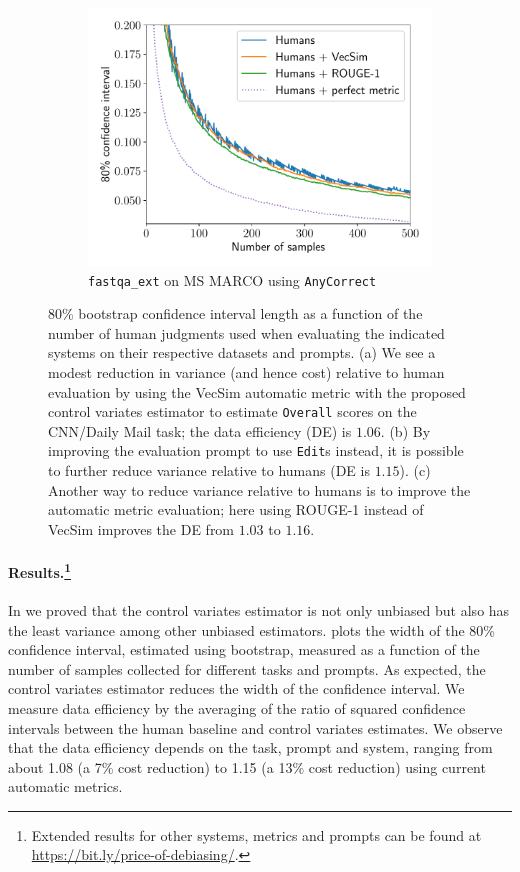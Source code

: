 \begin{figure}[th]
\begin{subfigure}[b]{0.32\textwidth}
  \includegraphics[width=\textwidth]{figures/msmarco_trajectory}
  \caption{\label{fig:trajectory-c}\texttt{fastqa\_ext} on MS MARCO using \texttt{AnyCorrect}}
  \end{subfigure}
  \caption{\label{fig:trajectory} 80\% bootstrap confidence interval length as a function of the number of human judgments used when evaluating the indicated systems on their respective datasets and prompts.
  (a) We see a modest reduction in variance (and hence cost) relative to human evaluation by using the VecSim automatic metric with the proposed control variates estimator to estimate \texttt{Overall} scores on the CNN/Daily Mail task; the data efficiency (DE) is $1.06$.
  (b) By improving the evaluation prompt to use \texttt{Edit}s instead, it is possible to further reduce variance relative to humans (DE is $1.15$).
  (c) Another way to reduce variance relative to humans is to improve the automatic metric evaluation; here using ROUGE-1 instead of VecSim improves the DE from $1.03$ to $1.16$.
  }
\end{figure}

\paragraph{Results.\footnote{%
  Extended results for other systems, metrics and prompts can be found at \url{https://bit.ly/price-of-debiasing/}.}
  }
In  we proved that the control variates estimator is not only unbiased but also has the least variance among other unbiased estimators.
 plots the width of the 80\% confidence interval, estimated using bootstrap, measured as a function of the number of samples collected for different tasks and prompts.
As expected, the control variates estimator reduces the width of the confidence interval. 
We measure data efficiency by the averaging of the ratio of squared confidence intervals between the human baseline and control variates estimates.
We observe that the data efficiency depends on the task, prompt and system, ranging from about 1.08 (a 7\% cost reduction) to 1.15 (a 13\% cost reduction) using current automatic metrics.

